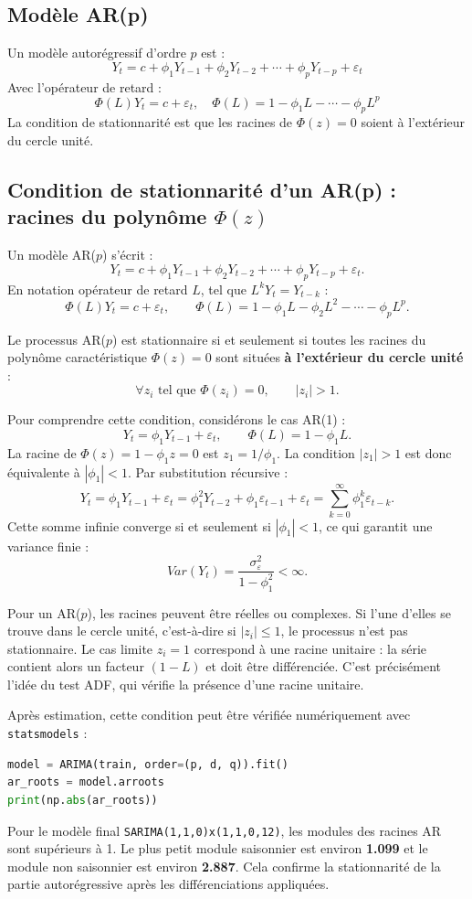\documentclass[12pt,a4paper]{report}
\begin{document}
\subsection{Modèle AR(p)}
Un modèle autorégressif d'ordre $p$ est :
\[
Y_t = c + \phi_1Y_{t-1} + \phi_2Y_{t-2} + \cdots + \phi_pY_{t-p} + \varepsilon_t
\]
Avec l'opérateur de retard :
\[
\Phi(L)Y_t = c + \varepsilon_t, \quad \Phi(L)=1-\phi_1L-\cdots-\phi_pL^p
\]
La condition de stationnarité est que les racines de $\Phi(z)=0$ soient à l'extérieur du cercle unité.


\subsection{Condition de stationnarité d'un AR(p) : racines du polynôme $\Phi(z)$}
Un modèle AR($p$) s'écrit :
\[
Y_t = c + \phi_1Y_{t-1}+\phi_2Y_{t-2}+\cdots+\phi_pY_{t-p}+\varepsilon_t.
\]
En notation opérateur de retard $L$, tel que $L^kY_t=Y_{t-k}$ :
\[
\Phi(L)Y_t = c + \varepsilon_t, \qquad \Phi(L)=1-\phi_1L-\phi_2L^2-\cdots-\phi_pL^p.
\]

Le processus AR($p$) est stationnaire si et seulement si toutes les racines du polynôme caractéristique $\Phi(z)=0$ sont situées \textbf{à l'extérieur du cercle unité} :
\[
\forall z_i \text{ tel que } \Phi(z_i)=0, \qquad |z_i|>1.
\]

Pour comprendre cette condition, considérons le cas AR(1) :
\[
Y_t = \phi_1Y_{t-1}+\varepsilon_t, \qquad \Phi(L)=1-\phi_1L.
\]
La racine de $\Phi(z)=1-\phi_1z=0$ est $z_1=1/\phi_1$. La condition $|z_1|>1$ est donc équivalente à $|\phi_1|<1$. Par substitution récursive :
\[
Y_t = \phi_1Y_{t-1}+\varepsilon_t
     = \phi_1^2Y_{t-2}+\phi_1\varepsilon_{t-1}+\varepsilon_t
     = \sum_{k=0}^{\infty}\phi_1^k\varepsilon_{t-k}.
\]
Cette somme infinie converge si et seulement si $|\phi_1|<1$, ce qui garantit une variance finie :
\[
Var(Y_t)=\frac{\sigma^2_{\varepsilon}}{1-\phi_1^2}<\infty.
\]

Pour un AR($p$), les racines peuvent être réelles ou complexes. Si l'une d'elles se trouve dans le cercle unité, c'est-à-dire si $|z_i|\leq 1$, le processus n'est pas stationnaire. Le cas limite $z_i=1$ correspond à une racine unitaire : la série contient alors un facteur $(1-L)$ et doit être différenciée. C'est précisément l'idée du test ADF, qui vérifie la présence d'une racine unitaire.

Après estimation, cette condition peut être vérifiée numériquement avec \texttt{statsmodels} :
\begin{lstlisting}[language=Python]
model = ARIMA(train, order=(p, d, q)).fit()
ar_roots = model.arroots
print(np.abs(ar_roots))
\end{lstlisting}
Pour le modèle final \texttt{SARIMA(1,1,0)x(1,1,0,12)}, les modules des racines AR sont supérieurs à 1. Le plus petit module saisonnier est environ \textbf{1.099} et le module non saisonnier est environ \textbf{2.887}. Cela confirme la stationnarité de la partie autorégressive après les différenciations appliquées.
\end{document}
